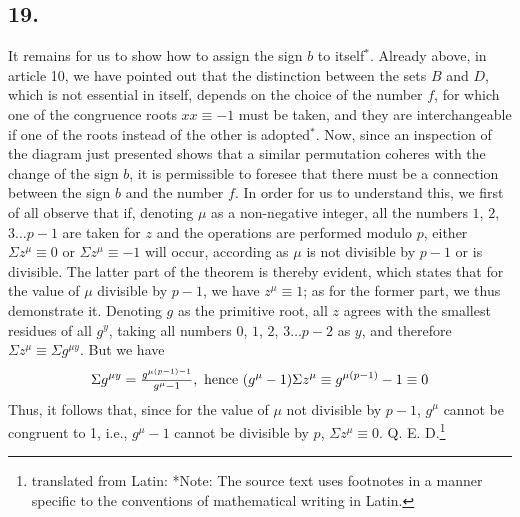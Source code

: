 \documentclass[twoside,12pt, showframe]{memoir}
\let\oldfrac\frac
\def\frac#1#2{\mathchoice{\tfrac{#1}{#2}}{\oldfrac{#1}{#2}}{\genfrac{}{}{}{2}{#1}{#2\mathstrut}}{\genfrac{}{}{}{3}{#1}{#2\mathstrut}}}
\begin{document}
\subsection*{19.}
It remains for us to show how to assign the sign \(b\) to itself\(^*\). Already above, in article 10, we have pointed out that the distinction between the sets \(B\) and \(D\), which is not essential in itself, depends on the choice of the number \(f\), for which one of the congruence roots \(x x \equiv-1\) must be taken, and they are interchangeable if one of the roots instead of the other is adopted\(^*\). Now, since an inspection of the diagram just presented shows that a similar permutation coheres with the change of the sign \(b\), it is permissible to foresee that there must be a connection between the sign \(b\) and the number \(f\). In order for us to understand this, we first of all observe that if, denoting \(\mu\) as a non-negative integer, all the numbers \(1\), \(2\), \(3 \ldots p-1\) are taken for \(z\) and the operations are performed modulo \(p\), either \(\Sigma z^{\mu} \equiv 0\) or \(\Sigma z^{\mu} \equiv-1\) will occur, according as \(\mu\) is not divisible by \(p-1\) or is divisible. The latter part of the theorem is thereby evident, which states that for the value of \(\mu\) divisible by \(p-1\), we have \(z^{\mu} \equiv 1\); as for the former part, we thus demonstrate it. Denoting \(g\) as the primitive root, all \(z\) agrees with the smallest residues of all \(g^{y}\), taking all numbers \(0\), \(1\), \(2\), \(3 \ldots p-2\) as \(y\), and therefore \(\Sigma z^{\mu} \equiv \Sigma g^{\mu y}\). But we have
\[\Sigma g^{\mu y}=\frac{g^{\mu(p-1)-1}}{g^{\mu}-1}, \text{ hence } (g^{\mu}-1) \Sigma z^{\mu} \equiv g^{\mu(p-1)}-1 \equiv 0\]
Thus, it follows that, since for the value of \(\mu\) not divisible by \(p-1\), \(g^{\mu}\) cannot be congruent to 1, i.e., \(g^{\mu}-1\) cannot be divisible by \(p\), \(\Sigma z^{\mu} \equiv 0\). Q. E. D.\footnote{translated from Latin: *Note: The source text uses footnotes in a manner specific to the conventions of mathematical writing in Latin.}
%
\end{document}
